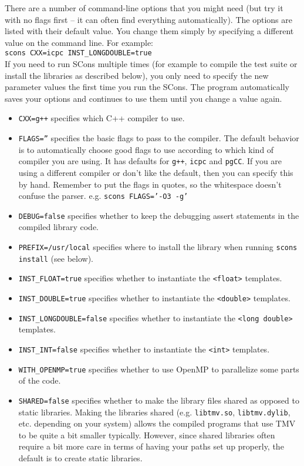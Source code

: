 \documentclass[twoside,letterpaper,11pt]{article}
\renewcommand{\tt}[1]{{\lstinline {#1}}}
\begin{document}
\begin{enumerate}
There are a number of command-line options that you might need (but try it with no flags
first -- it can often find everything automatically).  
The options are listed 
with their default value.  You change them simply by specifying a different value
on the command line.  For example:\\
\texttt{scons CXX=icpc INST\_LONGDOUBLE=true}\\
If you need to run SCons multiple times (for example to compile the test suite or install
the libraries as described below), you only need to specify the new parameter values the first
time you run the SCons.
The program automatically saves your options and continues to use them until you
change a value again.
\begin{itemize}
\item \texttt{CXX=g++} specifies which C++ compiler to use.
\item \texttt{FLAGS=''} specifies the basic flags to pass to the compiler.  The default behavior is to
automatically choose good flags to use according to which kind of compiler you are using.
It has defaults for \texttt{g++}, \texttt{icpc} and \texttt{pgCC}.  If you are using a different compiler or don't
like the default, then you can specify this by hand.  
Remember to put the flags in quotes,
so the whitespace doesn't confuse the parser.  e.g. \texttt{scons FLAGS='-O3 -g'}
\item \texttt{DEBUG=false} specifies whether to keep the debugging assert statements in the compiled library code.  
\item \texttt{PREFIX=/usr/local} specifies where to install the library when running \texttt{scons install} (see below).
\item \texttt{INST\_FLOAT=true} specifies whether to instantiate the \tt{<float>} templates.
\item \texttt{INST\_DOUBLE=true} specifies whether to instantiate the \tt{<double>} templates.
\item \texttt{INST\_LONGDOUBLE=false} specifies whether to instantiate the \tt{<long double>} templates.
\item \texttt{INST\_INT=false} specifies whether to instantiate the \tt{<int>} templates.
\item \texttt{WITH\_OPENMP=true} specifies whether to use OpenMP to parallelize some parts of the code.
\item \texttt{SHARED=false} specifies whether to make the library files shared as opposed to static libraries.  Making the libraries shared (e.g. \texttt{libtmv.so}, \texttt{libtmv.dylib}, etc. depending on your system) allows the compiled programs that use TMV to be quite a bit smaller typically.  However, since shared libraries often require a bit more care in terms of having your paths set up properly, the default is to create static libraries.

\end{itemize}
\end{enumerate}
\end{document}
